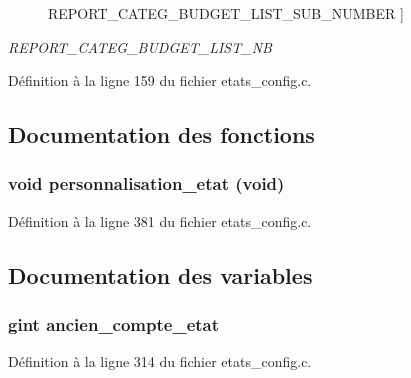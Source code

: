 \begin{Desc}
\begin{description}
{REPORT\_\-CATEG\_\-BUDGET\_\-LIST\_\-SUB\_\-NUMBER\label{etats__config_8c_adf764cbdea00d65edcd07bb9953ad2b7aa2972713d581d3fa10f20305368d0e2f}
}]\item[{\em 
REPORT\_\-CATEG\_\-BUDGET\_\-LIST\_\-NB\label{etats__config_8c_adf764cbdea00d65edcd07bb9953ad2b7a277c6e5e02c7dd70756f9fed8c4e7f9d}
}]\end{description}
\end{Desc}



Définition à la ligne 159 du fichier etats\_\-config.c.



\subsection{Documentation des fonctions}
\subsubsection[{personnalisation\_\-etat}]{\setlength{\rightskip}{0pt plus 5cm}void personnalisation\_\-etat (void)}\label{etats__config_8c_a9b69a48d62d062235b3e849dbf5cd951}


Définition à la ligne 381 du fichier etats\_\-config.c.



\subsection{Documentation des variables}
\subsubsection[{ancien\_\-compte\_\-etat}]{\setlength{\rightskip}{0pt plus 5cm}gint {\bf ancien\_\-compte\_\-etat}}\label{etats__config_8c_aa963ebc8f70f33f5f763428e5b60223d}


Définition à la ligne 314 du fichier etats\_\-config.c.

